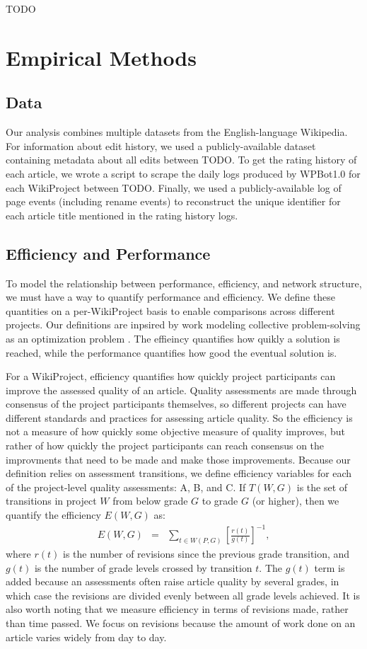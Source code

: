 \documentclass[10pt,twocolumn]{article}
\newcommand{\beq}{\begin{eqnarray}}
\newcommand{\eeq}{\end{eqnarray}}
\begin{document}
TODO

\section{Empirical Methods}

\subsection{Data}

Our analysis combines multiple datasets from the English-language Wikipedia.
For information about edit history, we used a publicly-available dataset containing
metadata about all edits between TODO.
To get the rating history of each article,
we wrote a script to scrape the daily logs produced by WPBot1.0 for each WikiProject
between TODO.
Finally, we used a publicly-available log of page events (including rename events)
to reconstruct the unique identifier for each article title mentioned in the rating history logs.

\subsection{Efficiency and Performance}

To model the relationship between performance, efficiency, and network structure,
we must have a way to quantify performance and efficiency.
We define these quantities on a per-WikiProject basis to enable comparisons across different
projects.
Our definitions are inpsired by work modeling collective problem-solving as an optimization
problem \cite{}.
The effieincy quantifies how quikly a solution is reached,
while the performance quantifies how good the eventual solution is.

For a WikiProject, efficiency quantifies how quickly project participants can improve the
assessed quality of an article.
Quality assessments are made through consensus of the project participants themselves,
so different projects can have different standards and practices for assessing article quality.
So the efficiency is not a measure of how quickly some objective measure of quality improves,
but rather of how quickly the project participants can reach consensus on the improvments that
need to be made and make those improvements.
Because our definition relies on assessment transitions, we define efficiency variables for
each of the project-level quality assessments: A, B, and C.
If $T(W,G)$ is the set of transitions in project $W$ from below grade $G$ to grade $G$ (or higher),
then we quantify the efficiency $E(W,G)$ as:
\beq
E(W,G) &=& \sum_{t \in W(P,G)} \left[ \frac{r(t)}{g(t)} \right]^{-1},
\eeq
where $r(t)$ is the number of revisions since the previous grade transition,
and $g(t)$ is the number of grade levels crossed by transition $t$.
The $g(t)$ term is added because an assessments often raise article quality by several
grades, in which case the revisions are divided evenly between all grade levels achieved.
It is also worth noting that we measure efficiency in terms of revisions made,
rather than time passed.
We focus on revisions because the amount of work done on an article varies widely from day to day.
\end{document}
